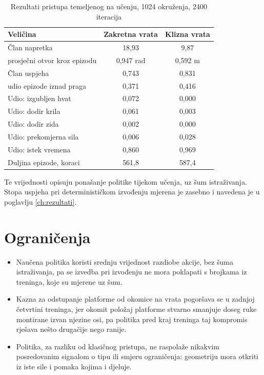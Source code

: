 \begin{table}[H]
    \centering
    \caption{Rezultati pristupa temeljenog na učenju, 1024 okruženja, 2400 iteracija}
    \label{tab:rl-rezultati}
    \begin{tabular}{@{}lcc@{}}
        \toprule
        Veličina                           & Zakretna vrata & Klizna vrata \\
        \midrule
        Član napretka                      & 18,93          & 9,87         \\
        \quad prosječni otvor kroz epizodu & 0,947 rad      & 0,592 m      \\
        Član uspjeha                       & 0,743          & 0,831        \\
        \quad udio epizode iznad praga     & 0,371          & 0,416        \\
        \midrule
        Udio: izgubljen hvat               & 0,072          & 0,000        \\
        Udio: dodir krila                  & 0,061          & 0,003        \\
        Udio: dodir zida                   & 0,002          & 0,000        \\
        Udio: prekomjerna sila             & 0,006          & 0,028        \\
        Udio: istek vremena                & 0,860          & 0,969        \\
        Duljina epizode, koraci            & 561,8          & 587,4        \\
        \bottomrule
    \end{tabular}
\end{table}

Te vrijednosti opisuju ponašanje politike tijekom učenja, uz šum istraživanja. Stopa uspjeha pri
determinističkom izvođenju mjerena je zasebno i navedena je u poglavlju \ref{ch:rezultati}.

\section{Ograničenja}
\label{sec:rl-limits}

\begin{itemize}
    \item Naučena politika koristi srednju vrijednost razdiobe akcije, bez šuma istraživanja, pa
          se izvedba pri izvođenju ne mora poklapati s brojkama iz treninga, koje su mjerene uz
          šum.

    \item Kazna za odstupanje platforme od okomice na vrata pogoršava se u zadnjoj četvrtini
          treninga, jer okomit položaj platforme stvarno smanjuje doseg ruke montirane izvan
          njezine osi, pa politika pred kraj treninga taj kompromis rješava nešto drugačije nego
          ranije.

    \item Politika, za razliku od klasičnog pristupa, ne raspolaže nikakvim posredovanim
          signalom o tipu ili smjeru ograničenja: geometriju mora otkriti iz iste sile i pomaka
          kojima i djeluje.
\end{itemize}
